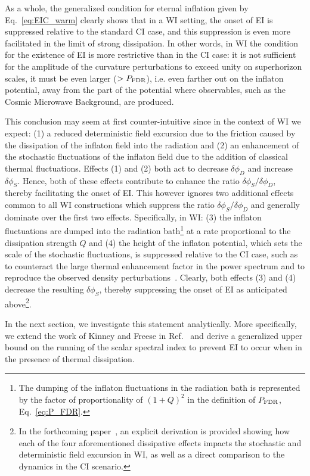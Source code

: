 \documentclass[a4paper,11pt]{article}
\begin{document}
As a whole, the generalized condition for eternal inflation given by
Eq.~\eqref{eq:EIC_warm} clearly shows that in a WI setting, the onset of EI is suppressed relative to the standard CI case, and
this suppression is even more facilitated in the limit of strong dissipation. In other words, in WI the condition for the existence of EI is more restrictive than in the CI case: it is not sufficient for the amplitude of the curvature perturbations to exceed unity on superhorizon scales, it must be even larger ($>P_{\rm{FDR}}$), i.e. even farther
out on the inflaton potential, away from the part of the potential where observables, such as the Cosmic
Microwave Background, are produced.

This
conclusion may seem at first counter-intuitive since in the context of
WI we expect: (1) a reduced deterministic field excursion due to the
friction caused by the dissipation of the inflaton field into the
radiation and (2) an enhancement of the stochastic fluctuations of the
inflaton field due to the addition of classical thermal
fluctuations. Effects (1) and (2) both act to decrease
$\delta\phi_D$ and increase $\delta\phi_S$. Hence, both of these
effects contribute to enhance the ratio $\delta\phi_S/\delta\phi_D$,
thereby facilitating the onset of EI. This however ignores two
additional effects common to all WI constructions which suppress the
ratio $\delta\phi_S/\delta\phi_D$ and generally dominate over the
first two effects. Specifically, in WI: (3) the inflaton fluctuations
are dumped into the radiation bath\footnote{The dumping of the
inflaton fluctuations in the radiation bath is represented by the
factor of proportionality of $(1+Q)^2$ in the definition of
$P_{\rm{FDR}}$, Eq.~\eqref{eq:P_FDR}. } at a rate proportional to the
dissipation strength $Q$ and (4) the height of the inflaton potential,
which sets the scale of the stochastic fluctuations, is suppressed
relative to the CI case, such as to counteract the large thermal
enhancement factor in the power spectrum and to reproduce the observed
density perturbations~\cite{Montefalcone:2022owy}. Clearly, both
effects (3) and (4) decrease the resulting $\delta\phi_S$, thereby
suppressing the onset of EI as anticipated above\footnote{In the
forthcoming paper~\cite{MRVFeistudy}, an explicit derivation is
provided showing how each of the four aforementioned dissipative
effects impacts the stochastic and deterministic field excursion in
WI, as well as a direct comparison to the dynamics in the CI
scenario.}.

In the next section, we investigate this statement analytically. More
specifically, we extend the work of Kinney and Freese in
Ref.~\cite{Kinney:2014jya} and derive a generalized upper bound on the
running of the scalar spectral index to prevent EI to occur when in
the presence of thermal dissipation.
\end{document}
